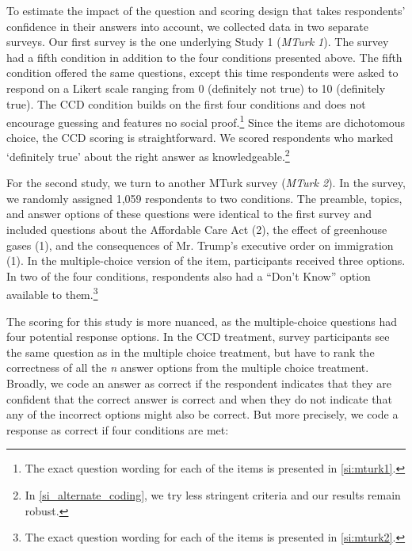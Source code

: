 \documentclass[12pt, letterpaper]{article}
\begin{document}
To estimate the impact of the question and scoring design that takes respondents' confidence in their answers into account, we collected data in two separate surveys. Our first survey is the one underlying Study 1 (\emph{MTurk 1}). The survey had a fifth condition in addition to the four conditions presented above. The fifth condition offered the same questions, except this time respondents were asked to respond on a Likert scale ranging from 0 (definitely not true) to 10 (definitely true). The CCD condition builds on the first four conditions and does not encourage guessing and features no social proof.\footnote{The exact question wording for each of the items is presented in \cref{si:mturk1}.} Since the items are dichotomous choice, the CCD scoring is straightforward. We scored respondents who marked `definitely true' about the right answer as knowledgeable.\footnote{In \cref{si_alternate_coding}, we try less stringent criteria and our results remain robust.}

For the second study, we turn to another MTurk survey (\emph{MTurk 2}). In the survey, we randomly assigned 1,059 respondents to two conditions. The preamble, topics, and answer options of these questions were identical to the first survey and included questions about the Affordable Care Act (2), the effect of greenhouse gases (1), and the consequences of Mr. Trump's executive order on immigration (1). In the multiple-choice version of the item, participants received three options. In two of the four conditions, respondents also had a ``Don't Know'' option available to them.\footnote{The exact question wording for each of the items is presented in \cref{si:mturk2}.}

The scoring for this study is more nuanced, as the multiple-choice questions had four potential response options. In the CCD treatment, survey participants see the same question as in the multiple choice treatment, but have to rank the correctness of all the \emph{n} answer options from the multiple choice treatment. Broadly, we code an answer as correct if the respondent indicates that they are confident that the correct answer is correct and when they do not indicate that any of the incorrect options might also be correct. But more precisely, we code a response as correct if four conditions are met:
\end{document}
